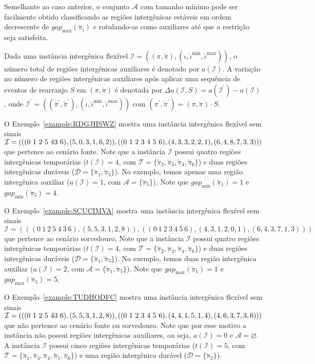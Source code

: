 Semelhante ao caso anterior, o conjunto $\mathcal{A}$ com tamanho mínimo pode ser facilmente obtido classificando as regiões intergênicas estáveis em ordem decrescente de $gap_{\max}(\breve\pi_i)$ e rotulando-as como auxiliares até que a restrição seja satisfeita. 

Dada uma instância intergênica flexível $\mathcal{I} = ((\pi,\breve\pi),(\iota,\breve\iota^{\min},\breve\iota^{\max}))$, o número total de regiões intergênicas auxiliares é denotado por $a(\mathcal{I})$. A variação no número de regiões intergênicas auxiliares após aplicar uma sequência de eventos de rearranjo $S$ em $(\pi,\breve\pi)$ é denotada por  $\Delta a(\mathcal{I},S) = a(\mathcal{I}^{\prime}) - a(\mathcal{I})$, onde $\mathcal{I}^{\prime} = ((\pi^{\prime}, \breve\pi^{\prime}),(\iota,\breve\iota^{\min},\breve\iota^{\max}))$ com $(\pi^{\prime}, \breve\pi^{\prime}) = (\pi, \breve\pi) \cdot S$.

O Exemplo~\ref{example:RDGJHSWZ} mostra uma instância intergênica flexível sem sinais $\mathcal{I} = (((0~1~2~5~4\break3~6),(5,0,3,1,6,2)),((0~1~2~3~4~5~6),(4,3,3,2,2,1),(6,4,8,7,3,3)))$ que pertence ao cenário fonte. Note que a instância $\mathcal{I}$ possui quatro regiões intergênicas temporárias ($t(\mathcal{I}) = 4$, com $\mathcal{T}=\{\breve\pi_2,\breve\pi_3,\breve\pi_4,\breve\pi_6\}$) e duas regiões intergênicas duráveis ($\mathcal{D}=\{\breve\pi_1,\breve\pi_5\}$). No exemplo, temos apenas uma região intergênica auxiliar ($a(\mathcal{I}) = 1$, com $\mathcal{A}=\{\breve\pi_5\}$). Note que $gap_{\min}(\breve\pi_1) = 1$ e $gap_{\min}(\breve\pi_5) = 4$.



O Exemplo~\ref{example:SCUCIMVA} mostra uma instância intergênica flexível sem sinais $\mathcal{I} = \allowbreak(((0~1~2~5~4~3\allowbreak~6),\allowbreak(5,5,3,1,2,8)),\allowbreak((0~1~2~3~4~5~6),\allowbreak(4,3,1,2,0,1),\allowbreak(6,4,3,7,1,3)))$ que pertence ao cenário sorvedouro. Note que a instância $\mathcal{I}$ possui quatro regiões intergênicas temporárias ($t(\mathcal{I}) = 4$, com $\mathcal{T}=\{\breve\pi_2,\breve\pi_3,\breve\pi_4,\breve\pi_6\}$) e duas regiões intergênicas duráveis ($\mathcal{D}=\{\breve\pi_1,\breve\pi_5\}$). No exemplo, temos duas região intergênica auxiliar ($a(\mathcal{I}) = 2$, com $\mathcal{A}=\{\breve\pi_1,\breve\pi_5\}$). Note que $gap_{\max}(\breve\pi_1) = 1$ e $gap_{\max}(\breve\pi_5) = 5$.



O Exemplo~\ref{example:TUDHODFC} mostra uma instância intergênica flexível sem sinais $\mathcal{I} = (((0~1~2~5~4\break3~6),(5,5,3,1,2,8)),((0~1~2~3~4~5~6),(4,4,1,5,1,4),(4,6,3,7,3,6)))$ que não pertence ao cenário fonte ou sorvedouro. Note que por esse motivo a instância não possui regiões intergênicas auxiliares, ou seja, $a(\mathcal{I}) = 0$ e $\mathcal{A}=\varnothing$. A instância $\mathcal{I}$ possui cinco regiões intergênicas temporárias ($t(\mathcal{I}) = 5$, com $\mathcal{T}=\{\breve\pi_1,\breve\pi_3,\breve\pi_4,\breve\pi_5,\breve\pi_6\}$) e uma região intergênica durável ($\mathcal{D}=\{\breve\pi_2\}$).

